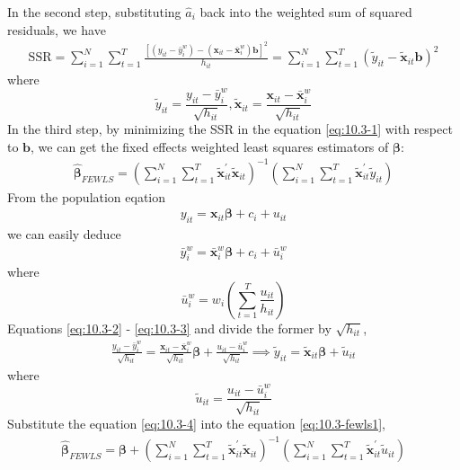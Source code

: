 \begin{enumerate}
\begin{enumerate}
        In the second step, substituting $\hat{a}_i$ back into the weighted sum of squared residuals, we have
        \begin{gather}
            \mathrm{SSR} = \sum_{i=1}^{N} \sum_{t=1}^{T} \frac{\left[ (y_{it}-\bar{y}_i^w) - (\mathbf{x}_{it}-\bar{\mathbf{x}}_i^w)\mathbf{b} \right]^2}{h_{it}} = \sum_{i=1}^{N} \sum_{t=1}^{T} (\tilde{y}_{it} - \tilde{\mathbf{x}}_{it} \mathbf{b})^2 \label{eq:10.3-1}
        \end{gather}
        where
        \[ \tilde{y}_{it} = \frac{y_{it}-\bar{y}_i^w}{\sqrt{h_{it}}}, \tilde{\mathbf{x}}_{it} = \frac{\mathbf{x}_{it}-\bar{\mathbf{x}}_i^w}{\sqrt{h_{it}}} \]
        In the third step, by minimizing the SSR in the equation \eqref{eq:10.3-1} with respect to $\mathbf{b}$, we can get the fixed effects weighted least squares estimators of $\bm{\beta}$: 
        \begin{gather}
            \hat{\bm{\beta}}_{FEWLS} = \left(\sum_{i=1}^{N} \sum_{t=1}^{T} \tilde{\mathbf{x}}_{i t}^{\prime} \tilde{\mathbf{x}}_{i t}\right)^{-1}\left(\sum_{i=1}^{N} \sum_{t=1}^{T} \tilde{\mathbf{x}}_{i t}^{\prime} \tilde{y}_{i t}\right) \label{eq:10.3-fewls1}
        \end{gather}
        From the population eqation
        \begin{gather}
            y_{i t}=\mathbf{x}_{i t} \boldsymbol{\beta}+c_{i}+u_{i t} \label{eq:10.3-2}
        \end{gather}
        we can easily deduce
        \begin{gather}
            \bar{y}_i^w = \bar{\mathbf{x}}_i^w \bm{\beta} + c_i + \bar{u}_i^w \label{eq:10.3-3}
        \end{gather}
        where
        \[ \bar{u}_i^w = w_i\left( \sum_{t=1}^T \frac{u_{it}}{h_{it}} \right) \]
        Equations \eqref{eq:10.3-2} - \eqref{eq:10.3-3} and divide the former by $\sqrt{h_{it}}$,
        \begin{gather}
            \frac{y_{it}-\bar{y}_i^w}{\sqrt{h_{it}}} = \frac{\mathbf{x}_{it}-\bar{\mathbf{x}}_i^w}{\sqrt{h_{it}}} \bm{\beta} + \frac{u_{it}-\bar{u}_i^w}{\sqrt{h_{it}}} \implies \tilde{y}_{it} = \tilde{\mathbf{x}}_{it} \bm{\beta} + \tilde{u}_{it} \label{eq:10.3-4}
        \end{gather}
        where
        \[ \tilde{u}_{it} = \frac{u_{it}-\bar{u}_i^w}{\sqrt{h_{it}}} \]
        Substitute the equation \eqref{eq:10.3-4} into the equation \eqref{eq:10.3-fewls1},
        \begin{gather}
            \hat{\bm{\beta}}_{FEWLS} = \bm{\beta} + \left(\sum_{i=1}^{N} \sum_{t=1}^{T} \tilde{\mathbf{x}}_{i t}^{\prime} \tilde{\mathbf{x}}_{i t}\right)^{-1}\left(\sum_{i=1}^{N} \sum_{t=1}^{T} \tilde{\mathbf{x}}_{i t}^{\prime} \tilde{u}_{i t}\right) \label{eq:10.3-fewls2}

\end{gather}
\end{enumerate}
\end{enumerate}
